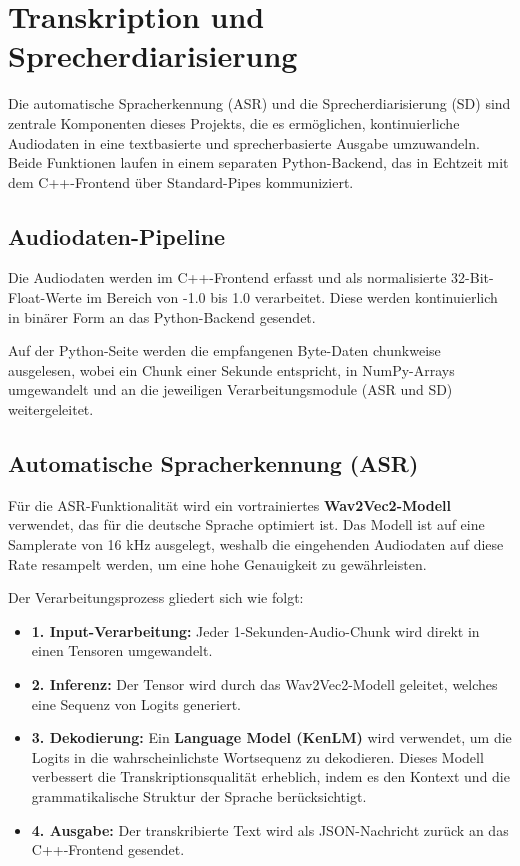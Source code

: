 \chapter{Transkription und Sprecherdiarisierung}
\label{chap:ki}

Die automatische Spracherkennung (ASR) und die Sprecherdiarisierung (SD) sind zentrale Komponenten dieses Projekts, die es ermöglichen, kontinuierliche Audiodaten in eine textbasierte und sprecherbasierte Ausgabe umzuwandeln. Beide Funktionen laufen in einem separaten Python-Backend, das in Echtzeit mit dem C++-Frontend über Standard-Pipes kommuniziert.


\section{Audiodaten-Pipeline}

Die Audiodaten werden im C++-Frontend erfasst und als normalisierte 32-Bit-Float-Werte im Bereich von -1.0 bis 1.0 verarbeitet. Diese werden kontinuierlich in binärer Form an das Python-Backend gesendet.

Auf der Python-Seite werden die empfangenen Byte-Daten chunkweise ausgelesen, wobei ein Chunk einer Sekunde entspricht, in NumPy-Arrays umgewandelt und an die jeweiligen Verarbeitungsmodule (ASR und SD) weitergeleitet.


\section{Automatische Spracherkennung (ASR)}

Für die ASR-Funktionalität wird ein vortrainiertes \textbf{Wav2Vec2-Modell} verwendet, das für die deutsche Sprache optimiert ist. Das Modell ist auf eine Samplerate von 16 kHz ausgelegt, weshalb die eingehenden Audiodaten auf diese Rate resampelt werden, um eine hohe Genauigkeit zu gewährleisten.

Der Verarbeitungsprozess gliedert sich wie folgt:
\begin{itemize}
\item \textbf{1. Input-Verarbeitung:} Jeder 1-Sekunden-Audio-Chunk wird direkt in einen Tensoren umgewandelt.
\item \textbf{2. Inferenz:} Der Tensor wird durch das Wav2Vec2-Modell geleitet, welches eine Sequenz von Logits generiert.
\item \textbf{3. Dekodierung:} Ein \textbf{Language Model (KenLM)} wird verwendet, um die Logits in die wahrscheinlichste Wortsequenz zu dekodieren. Dieses Modell verbessert die Transkriptionsqualität erheblich, indem es den Kontext und die grammatikalische Struktur der Sprache berücksichtigt.
\item \textbf{4. Ausgabe:} Der transkribierte Text wird als JSON-Nachricht zurück an das C++-Frontend gesendet.
\end{itemize}

